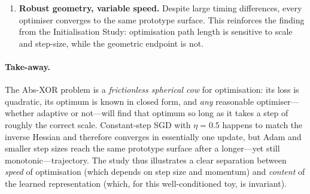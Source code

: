 \begin{enumerate}[label=\arabic*.]
    \item \textbf{Robust geometry, variable speed.}  
          Despite large timing differences, every optimiser converges to
          the same prototype surface.  This reinforces the finding from
          the Initialisation Study: optimisation path length is sensitive to
          scale and step-size, while the geometric endpoint is not.

        \end{enumerate}

\paragraph{Take-away.}
The Abs-XOR problem is a \textit{frictionless spherical cow} for optimisation:
its loss is quadratic, its optimum is known in closed form, and \emph{any}
reasonable optimiser—whether adaptive or not—will find that optimum so long
as it takes a step of roughly the correct scale.  Constant-step SGD with
\(\eta = 0.5\) happens to match the inverse Hessian and therefore converges
in essentially one update, but Adam and smaller step sizes reach the same
prototype surface after a longer—yet still monotonic—trajectory.  The study
thus illustrates a clear separation between \emph{speed} of optimisation
(which depends on step size and momentum) and \emph{content} of the learned
representation (which, for this well-conditioned toy, is invariant).
